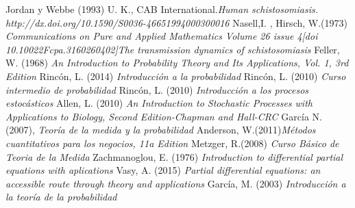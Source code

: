 \clearpage
{}
\begin{thebibliography}{25}
Jordan y Webbe (1993) U. K., CAB International.\emph{Human schistosomiasis. http://dx.doi.org/10.1590/S0036-46651994000300016}
Nasell,I. , Hirsch, W.(1973)\emph{ Communications on Pure and Applied Mathematics Volume 26 issue 4[doi 10.10022Fcpa.3160260402]The transmission dynamics of schistosomiasis}
Feller, W. (1968)\emph{ An Introduction to Probability Theory and Its Applications, Vol. 1, 3rd Edition}
 Rincón, L. (2014) \emph{Introducción a la probabilidad}
 Rincón, L. (2010) \emph{Curso intermedio de probabilidad}
 Rincón, L. (2010) \emph{ Introducción a los procesos estocásticos}
 Allen, L. (2010)\emph{ An Introduction to Stochastic Processes with Applications to Biology, Second Edition-Chapman and Hall-CRC}
 García N.(2007), \emph{Teoría de la medida y la probabilidad}
 Anderson, W.(2011)\emph{Métodos cuantitativos para los negocios, 11a Edition}
 Metzger, R.(2008) \emph{Curso Básico de Teoria de la Medida}
 Zachmanoglou, E. (1976) \emph{Introduction to differential partial equations with aplications}
 Vasy, A. (2015) \emph{Partial differential equations: an accessible route through theory and applications}
 García, M. (2003) \emph{Introducción a la teoría de la probabilidad}
\end{thebibliography}


